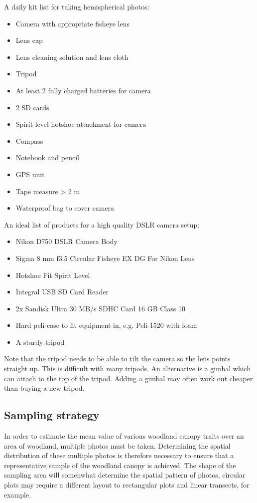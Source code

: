 \documentclass{article}
\begin{document}
A daily kit list for taking hemispherical photos:

\begin{itemize}
	\item{Camera with appropriate fisheye lens}
	\item{Lens cap}
	\item{Lens cleaning solution and lens cloth}
	\item{Tripod}
	\item{At least 2 fully charged batteries for camera}
	\item{2 SD cards}
	\item{Spirit level hotshoe attachment for camera}
	\item{Compass}
	\item{Notebook and pencil}
	\item{GPS unit}
	\item{Tape measure > 2 m}
	\item{Waterproof bag to cover camera}
\end{itemize}

An ideal list of products for a high quality DSLR camera setup:

\begin{itemize}
	\item{Nikon D750 DSLR Camera Body}
	\item{Sigma 8 mm f3.5 Circular Fisheye EX DG For Nikon Lens}
	\item{Hotshoe Fit Spirit Level}
	\item{Integral USB SD Card Reader}
	\item{2x Sandisk Ultra 30 MB/s SDHC Card 16 GB Class 10}
	\item{Hard peli-case to fit equipment in, e.g. Peli-1520 with foam}
	\item{A sturdy tripod}
\end{itemize}

Note that the tripod needs to be able to tilt the camera so the lens points straight up. This is difficult with many tripods. An alternative is a gimbal which can attach to the top of the tripod. Adding a gimbal may often work out cheaper than buying a new tripod.

\subsection{Sampling strategy}

In order to estimate the mean value of various woodland canopy traits over an area of woodland, multiple photos must be taken. Determining the spatial distribution of these multiple photos is therefore necessary to ensure that a representative sample of the woodland canopy is achieved. The shape of the sampling area will somehwhat determine the spatial pattern of photos, circular plots may require a different layout to rectangular plots and linear transects, for example.
\end{document}
